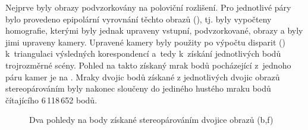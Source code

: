 \documentclass[11pt,oneside,a4paper,pdftex]{article}   %
\begin{document}
	Nejprve byly obrazy podvzorkovány na poloviční rozlišení. Pro jednotlivé páry bylo provedeno
	epipolární vyrovnání těchto obrazů (), tj. byly vypočteny
	homografie, kterými byly jednak upraveny vstupní, podvzorkované, obrazy a byly jimi upraveny kamery.
	Upravené kamery byly použity po výpočtu disparit
	() k~triangulaci výsledných korespondencí a~tedy
	k~získání jednotlivých bodů trojrozměrné scény. Pohled na takto získaný mrak bodů pocházející
	z~je\-dno\-ho páru kamer je na . Mraky dvojic bodů získané z jednotlivých
	dvojic obrazů stereopárováním byly nakonec sloučeny do jediného hustého mraku bodů čítajícího
	6\,118\,652 bodů.

			\begin{figure}[htbp]
					\centering
				\caption{Dva pohledy na body získané stereopárováním dvojice obrazů (b,f)}
				\label{figStereoPair26}
			\end{figure}
	
\end{document}
